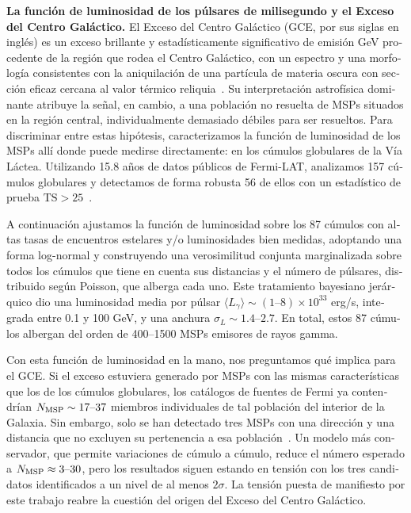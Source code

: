 \begin{otherlanguage}{spanish}
\textbf{La función de luminosidad de los púlsares de milisegundo y el Exceso del Centro Galáctico.} El Exceso del Centro Galáctico (GCE, por sus siglas en inglés) es un exceso brillante y estadísticamente significativo de emisión GeV procedente de la región que rodea el Centro Galáctico, con un espectro y una morfología consistentes con la aniquilación de una partícula de materia oscura con sección eficaz cercana al valor térmico reliquia~\cite{Goodenough:2009gk, Hooper:2010mq, Daylan:2014rsa}. Su interpretación astrofísica dominante atribuye la señal, en cambio, a una población no resuelta de MSPs situados en la región central, individualmente demasiado débiles para ser resueltos. Para discriminar entre estas hipótesis, caracterizamos la función de luminosidad de los MSPs allí donde puede medirse directamente: en los cúmulos globulares de la Vía Láctea. Utilizando 15.8 años de datos públicos de Fermi-LAT, analizamos 157 cúmulos globulares y detectamos de forma robusta 56 de ellos con un estadístico de prueba $\mathrm{TS} > 25$~\cite{Amerio:2024qor}.

A continuación ajustamos la función de luminosidad sobre los 87 cúmulos con altas tasas de encuentros estelares y/o luminosidades bien medidas, adoptando una forma log-normal y construyendo una verosimilitud conjunta marginalizada sobre todos los cúmulos que tiene en cuenta sus distancias y el número de púlsares, distribuido según Poisson, que alberga cada uno. Este tratamiento bayesiano jerárquico dio una luminosidad media por púlsar $\langle L_\gamma\rangle \sim (1\text{--}8)\times 10^{33}$ erg/s, integrada entre 0.1 y 100 GeV, y una anchura $\sigma_L \sim 1.4\text{--}2.7$. En total, estos 87 cúmulos albergan del orden de 400--1500 MSPs emisores de rayos gamma.

Con esta función de luminosidad en la mano, nos preguntamos qué implica para el GCE. Si el exceso estuviera generado por MSPs con las mismas características que los de los cúmulos globulares, los catálogos de fuentes de Fermi ya contendrían $N_{\rm MSP} \sim 17\text{--}37$ miembros individuales de tal población del interior de la Galaxia. Sin embargo, solo se han detectado tres MSPs con una dirección y una distancia que no excluyen su pertenencia a esa población~\cite{Holst:2024fvb}. Un modelo más conservador, que permite variaciones de cúmulo a cúmulo, reduce el número esperado a $N_{\rm MSP} \approx 3\text{--}30$, pero los resultados siguen estando en tensión con los tres candidatos identificados a un nivel de al menos $2\sigma$.
La tensión puesta de manifiesto por este trabajo reabre la cuestión del origen del Exceso del Centro Galáctico.


\end{otherlanguage}
